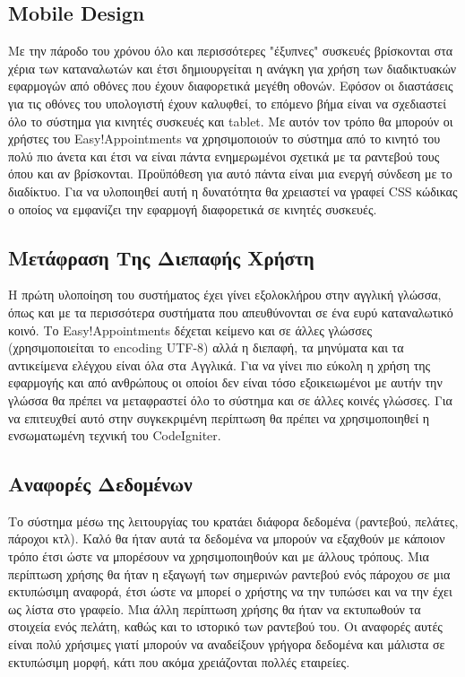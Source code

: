 \subsection{Mobile Design}
Με την πάροδο του χρόνου όλο και περισσότερες "έξυπνες" συσκευές βρίσκονται στα χέρια των καταναλωτών και έτσι δημιουργείται η ανάγκη για χρήση των διαδικτυακών εφαρμογών από οθόνες που έχουν διαφορετικά μεγέθη οθονών. Εφόσον οι διαστάσεις για τις οθόνες του υπολογιστή έχουν καλυφθεί, το επόμενο βήμα είναι να σχεδιαστεί όλο το σύστημα για κινητές συσκευές και tablet. Με αυτόν τον τρόπο θα μπορούν οι χρήστες του Easy!Appointments να χρησιμοποιούν το σύστημα από το κινητό του πολύ πιο άνετα και έτσι να είναι πάντα ενημερωμένοι σχετικά με τα ραντεβού τους όπου και αν βρίσκονται. Προϋπόθεση για αυτό πάντα είναι μια ενεργή σύνδεση με το διαδίκτυο. Για να υλοποιηθεί αυτή η δυνατότητα θα χρειαστεί να γραφεί CSS κώδικας ο οποίος να εμφανίζει την εφαρμογή διαφορετικά σε κινητές συσκευές.

\subsection{Μετάφραση Της Διεπαφής Χρήστη}
Η πρώτη υλοποίηση του συστήματος έχει γίνει εξολοκλήρου στην αγγλική γλώσσα, όπως και με τα περισσότερα συστήματα που απευθύνονται σε ένα ευρύ καταναλωτικό κοινό. Το Easy!Appointments δέχεται κείμενο και σε άλλες γλώσσες (χρησιμοποιείται το encoding UTF-8) αλλά η διεπαφή, τα μηνύματα και τα αντικείμενα ελέγχου είναι όλα στα Αγγλικά. Για να γίνει πιο εύκολη η χρήση της εφαρμογής και από ανθρώπους οι οποίοι δεν είναι τόσο εξοικειωμένοι με αυτήν την γλώσσα θα πρέπει να μεταφραστεί όλο το σύστημα και σε άλλες κοινές γλώσσες. Για να επιτευχθεί αυτό στην συγκεκριμένη περίπτωση θα πρέπει να χρησιμοποιηθεί η ενσωματωμένη τεχνική του CodeIgniter.

\subsection{Αναφορές Δεδομένων}
Το σύστημα μέσω της λειτουργίας του κρατάει διάφορα δεδομένα (ραντεβού, πελάτες, πάροχοι κτλ). Καλό θα ήταν αυτά τα δεδομένα να μπορούν να εξαχθούν με κάποιον τρόπο έτσι ώστε να μπορέσουν να χρησιμοποιηθούν και με άλλους τρόπους. Μια περίπτωση χρήσης θα ήταν η εξαγωγή των σημερινών ραντεβού ενός πάροχου σε μια εκτυπώσιμη αναφορά, έτσι ώστε να μπορεί ο χρήστης να την τυπώσει και να την έχει ως λίστα στο γραφείο. Μια άλλη περίπτωση χρήσης θα ήταν να εκτυπωθούν τα στοιχεία ενός πελάτη, καθώς και το ιστορικό των ραντεβού του. Οι αναφορές αυτές είναι πολύ χρήσιμες γιατί μπορούν να αναδείξουν γρήγορα δεδομένα και μάλιστα σε εκτυπώσιμη μορφή, κάτι που ακόμα χρειάζονται πολλές εταιρείες.

